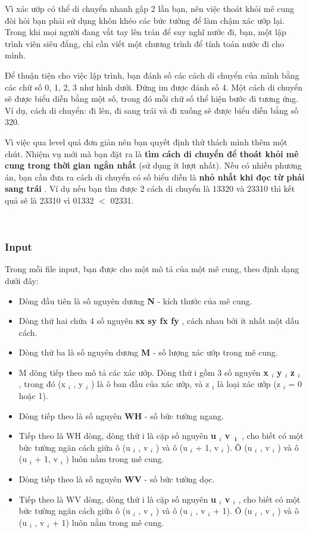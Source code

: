 Vì xác ướp có thể di chuyển nhanh gấp 2 lần bạn, nên việc thoát khỏi mê cung đòi hỏi bạn phải sử dụng khôn khéo các bức tường để làm chậm xác ướp lại. Trong khi mọi người đang vắt tay lên trán để suy nghĩ nước đi, bạn, một lập trình viên siêu đẳng, chỉ cần viết một chương trình để tính toán nước đi cho mình.

Để thuận tiện cho việc lập trình, bạn đánh số các cách di chuyển của mình bằng các chữ số 0, 1, 2, 3 như hình dưới. Đứng im được đánh số 4. Một cách di chuyển sẽ được biểu diễn bằng một số, trong đó mỗi chữ số thể hiện bước đi tương ứng. Ví dụ, cách di chuyển: đi lên, đi sang trái và đi xuống sẽ được biểu diễn bằng số 320.

Vì việc qua level quá đơn giản nên bạn quyết định thử thách mình thêm một chút. Nhiệm vụ mới mà bạn đặt ra là \textbf{ tìm cách di chuyển để thoát khỏi mê cung trong thời gian ngắn nhất } (sử dụng ít lượt nhất). Nếu có nhiều phương án, bạn cần đưa ra cách di chuyển có số biểu diễn là \textbf{ nhỏ nhất khi đọc từ phải sang trái } . Ví dụ nếu bạn tìm được 2 cách di chuyển là 13320 và 23310 thì kết quả sẽ là 23310 vì 01332 $<$ 02331.

 

\subsubsection{Input}

Trong mỗi file input, bạn được cho một mô tả của một mê cung, theo định dạng dưới đây:
\begin{itemize}
	\item Dòng đầu tiên là số nguyên dương \textbf{ N } - kích thước của mê cung.
	\item Dòng thứ hai chứa 4 số nguyên \textbf{ sx sy fx fy } , cách nhau bởi ít nhất một dấu cách.
	\item Dòng thứ ba là số nguyên dương \textbf{ M } - số lượng xác ướp trong mê cung.
	\item M dòng tiếp theo mô tả các xác ướp. Dòng thứ i gồm 3 số nguyên \textbf{ x $_ i $}\textbf{ y $_ i $}\textbf{ z $_ i $} , trong đó (x $_ i $ , y $_ i $ ) là ô ban đầu của xác ướp, và z $_ i $ là loại xác ướp (z $_ i $ = 0 hoặc 1).
	\item Dòng tiếp theo là số nguyên \textbf{ WH } - số bức tường ngang.
	\item Tiếp theo là WH dòng, dòng thứ i là cặp số nguyên \textbf{ u $_ i $ v }$_\textbf{ i }$ , cho biết có một bức tường ngăn cách giữa ô (u $_ i $ , v $_ i $ ) và ô (u $_ i $ + 1, v $_ i $ ). Ô (u $_ i $ , v $_ i $ ) và ô (u $_ i $ + 1, v $_ i $ ) luôn nằm trong mê cung.
	\item Dòng tiếp theo là số nguyên \textbf{ WV } - số bức tường dọc.
	\item Tiếp theo là WV dòng, dòng thứ i là cặp số nguyên \textbf{ u $_ i $ v $_ i $} , cho biết có một bức tường ngăn cách giữa ô (u $_ i $ , v $_ i $ ) và ô (u $_ i $ , v $_ i $ + 1). Ô (u $_ i $ , v $_ i $ ) và ô (u $_ i $ , v $_ i $ + 1) luôn nằm trong mê cung.
\end{itemize}

